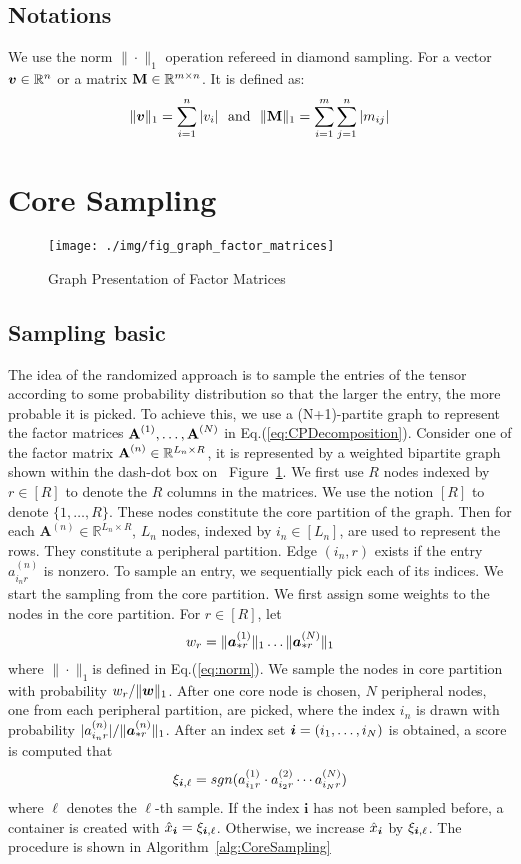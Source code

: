 \documentclass[letterpaper]{article}
\newcommand{\Sca}[3]{{#1}^{(#2)}_{i_#2#3}}%
\newcommand{\anr}[2]{\Sca{a}{#1}{#2}}
\newcommand{\score}[1]{\xi_{\V{i},#1}}
\newcommand{\V}[1]{{\boldsymbol{{\MakeLowercase{#1}}}}}
\newcommand{\VnC}[3]{\V{#1}^{(#2)}_{#3}}
\newcommand{\Nrocl}[2]{\norm{\VnC{a}{#1}{*#2}}{1}}
\newcommand{\Vacol}[1]{\V{a}^{(#1)}_{*r}}
\newcommand{\M}[1]{{\textbf{{\MakeUppercase{#1}}}}}
\newcommand{\Mn}[2]{\M{#1}^{(#2)}}
\newcommand{\norm}[2]{\|#1\|_{#2}}
\newcommand{\Eqn}[1]   {Eq.(\ref{eq:#1})}
\newcommand{\Fig}[1]   {Figure~\ref{fig:#1}}
\newcommand{\Alg}[1] {Algorithm~\ref{alg:#1}}
\newcommand{\WeightR}{\Nrocl{1}{r}\ldots\Nrocl{N}{r}}
\newcommand{\predx}{\hat{x}_{\V{i}}}
\begin{document}
\subsection{Notations}

We use the norm $\norm{\cdot}{1}$ operation refereed in diamond sampling.
For a vector $\V{v}\in \mathbb{R}^n$ or a matrix $\M{M}\in \mathbb{R}^{m\times n}$.
It is defined as:
\begin{align}
    \label{eq:norm}
    \norm{\V{v}}{1} = \sum_{i=1}^{n}|v_i|
    \ \  {\rm and} \ \
    \norm{\M{M}}{1} = \sum_{i=1}^{m}\sum_{j=1}^{n}|m_{ij}|
\end{align}


\section{Core Sampling}
\begin{figure}[t]
  \centering
  \texttt{[image: ./img/fig\_graph\_factor\_matrices]}\\
  \caption{Graph Presentation of Factor Matrices}
  \label{fig:GraphMatrices}
\end{figure}
\subsection{Sampling basic}
The idea of the randomized approach is 
to sample the entries of the tensor according to some probability distribution 
so that the larger the entry, the more probable it is picked. 
To achieve this, we use a (N+1)-partite graph to represent the factor matrices
$\Mn{A}{1},\ldots,\Mn{A}{N}$ in \Eqn{CPDecomposition}.
Consider one of the factor matrix $\Mn{A}{n}\in \mathbb{R}^{L_n \times R}$,
it is represented by a weighted bipartite graph shown within the dash-dot box on ~\Fig{GraphMatrices}.
We first use $R$ nodes indexed by $r\in[R]$ to denote the $R$ columns in the matrices. 
We use the notion $[R]$ to denote $\{1,\ldots,R\}$. 
These nodes constitute the core partition of the graph. 
Then for each $\textbf{A}^{(n)}\in\mathbb{R}^{L_n\times R}$, $L_n$ nodes, 
indexed by $i_n\in[L_n]$, are used to represent the rows. 
They constitute a peripheral partition. 
Edge $(i_n,r)$ exists if the entry $a_{i_nr}^{(n)}$ is nonzero.
To sample an entry, we sequentially pick each of its indices. 
We start the sampling from the core partition. 
We first assign some weights to the nodes in the core partition. 
For $r\in[R]$, let
\[
    w_r = \WeightR
\]
where $\norm{\cdot}{1}$is defined in \Eqn{norm}. 
We sample the nodes in core partition with probability $w_r/\norm{\V{W}}{1}$. 
After one core node is chosen, 
$N$ peripheral nodes, one from each peripheral partition, are picked, 
where the index $i_n$ is drawn with probability $|\anr{n}{r}|/\norm{\Vacol{n}}{1}$. 
After an index set $\V{i}=(i_1,\ldots,i_N)$ is obtained, 
a score is computed that
\[
\score{\ell}  = sgn(\anr{1}{r}\cdot\anr{2}{r}\cdots\anr{N}{r})
\]
where $\ell$ denotes the $\ell$-th sample. 
If the index $\boldsymbol{i}$ has not been sampled before, 
a container is created with $\predx = \score{\ell}$. 
Otherwise, we increase $\predx$ by $\score{\ell}$. 
The procedure is shown in \Alg{CoreSampling}
\end{document}
